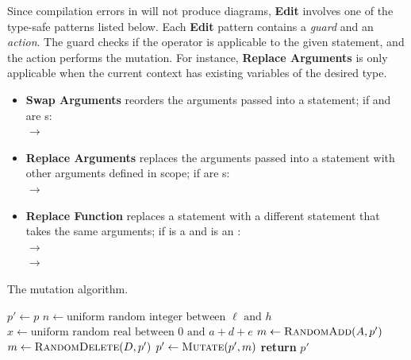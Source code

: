 Since compilation errors in \Substance will not produce diagrams, \textbf{Edit} involves one of the type-safe patterns listed below. Each \textbf{Edit} pattern contains a \emph{guard} and an \emph{action}. The guard checks if the operator is applicable to the given \Substance statement, and the action performs the mutation. For instance, \textbf{Replace Arguments} is only applicable when the current context has existing variables of the desired type. 
\begin{itemize}[leftmargin=*]
    \item \textbf{Swap Arguments} reorders the arguments passed into a statement; \eg if  and  are s:\\
             $\rightarrow$ 
    \item \textbf{Replace Arguments} replaces the arguments passed into a statement with other arguments defined in scope; \eg if  are s:\\
             	$\rightarrow$ 
    \item \textbf{Replace Function} replaces a statement with a different statement that takes the same arguments; \eg if  is a  and  is an :\\
             $\rightarrow$  \\
             $\rightarrow$ 
\end{itemize}

\begin{algorithm}
\caption{The \Edgeworth mutation algorithm. }\label{alg:mutation}
\begin{algorithmic}[1]
\State $p' \gets p$
\State $n \gets \text{uniform random integer between $\ell$ and $h$}$\label{line:mutations}
    \State $x \gets \text{uniform random real between $0$ and $a + d + e$}$\label{line:kind}
        \State $m \gets \textsc{RandomAdd}(A, p')$\label{line:add}
        \State $m \gets \textsc{RandomDelete}(D, p')$\label{line:delete}
    \Else
        \label{line:statements}
        \label{line:edit}
    \EndIf
    \State $p' \gets \textsc{Mutate}(p', m)$
\EndFor
\State \textbf{return} $p'$
\EndFunction
\end{algorithmic}
\end{algorithm}

